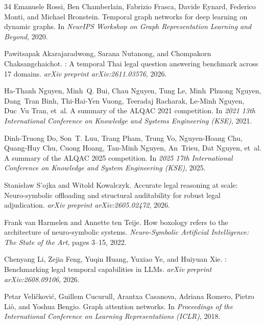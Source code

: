 \documentclass[11pt,a4paper]{article}
\begin{document}
\begin{thebibliography}{34}
Emanuele Rossi, Ben Chamberlain, Fabrizio Frasca, Davide Eynard, Federico
  Monti, and Michael Bronstein.
\newblock Temporal graph networks for deep learning on dynamic graphs.
\newblock In \emph{NeurIPS Workshop on Graph Representation Learning and
  Beyond}, 2020.

Pawitsapak Akarajaradwong, Sarana Nutanong, and Chompakorn Chaksangchaichot.
: A temporal {Thai} legal question answering benchmark across 17 domains.
\newblock \emph{arXiv preprint arXiv:2611.03576}, 2026.

Ha-Thanh Nguyen, Minh~Q. Bui, Chau Nguyen, Tung Le, Minh~Phuong Nguyen, Dang~Tran Binh, Thi-Hai-Yen Vuong, Teeradaj Racharak, Le-Minh Nguyen, Duc~Vu Tran, et~al.
\newblock A summary of the {ALQAC} 2021 competition.
\newblock In \emph{2021 13th International Conference on Knowledge and Systems Engineering (KSE)}, 2021.

Dinh-Truong Do, Son~T. Luu, Trang Pham, Trung Vo, Nguyen-Hoang Chu, Quang-Huy Chu, Cuong Hoang, Tan-Minh Nguyen, An~Trieu, Dat Nguyen, et~al.
\newblock A summary of the {ALQAC} 2025 competition.
\newblock In \emph{2025 17th International Conference on Knowledge and System Engineering (KSE)}, 2025.

Stanis{\l}aw S{'o}jka and Witold Kowalczyk.
\newblock Accurate legal reasoning at scale: Neuro-symbolic offloading and
  structural auditability for robust legal adjudication.
\newblock \emph{arXiv preprint arXiv:2605.02472}, 2026.

Frank van Harmelen and Annette ten Teije.
\newblock How boxology refers to the architecture of neuro-symbolic systems.
\newblock \emph{Neuro-Symbolic Artificial Intelligence: The State of the Art},
  pages 3--15, 2022.

Chenyang Li, Zejia Feng, Yuqin Huang, Yuxiao Ye, and Huiyuan Xie.
: Benchmarking legal temporal capabilities in {LLMs}.
\newblock \emph{arXiv preprint arXiv:2608.09106}, 2026.

Petar Veli{\v{c}}kovi{\'c}, Guillem Cucurull, Arantxa Casanova, Adriana Romero,
  Pietro Li{\`o}, and Yoshua Bengio.
\newblock Graph attention networks.
\newblock In \emph{Proceedings of the International Conference on Learning
  Representations (ICLR)}, 2018.


\end{thebibliography}
\end{document}
